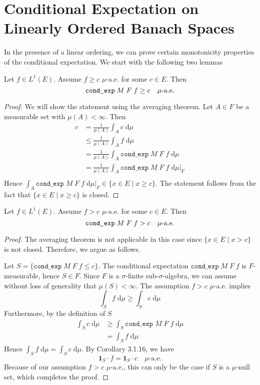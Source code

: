 \section{Conditional Expectation on Linearly Ordered Banach Spaces}

In the presence of a linear ordering, we can prove certain monotonicity properties of the conditional expectation. We start with the following two lemmas

\begin{lemma}
	Let $f \in L^1(E)$. Assume $f \ge c$ $\mu$-a.e. for some $c \in E$. Then 
	\[
		\normalfont\texttt{cond\_exp} \; M \; F \; f \ge c \quad \mu\textrm{-a.e.}
	\]
\end{lemma}
\begin{proof}
	We will show the statement using the averaging theorem. Let $A \in F$ be a measurable set with $\mu(A) < \infty$. Then
	\begin{align*}
		c &= \frac{1}{\mu(A)} \int_A c \; \textrm{d} \mu \\
		&\le \frac{1}{\mu(A)} \int_A f \; \textrm{d} \mu \\
		&= \frac{1}{\mu(A)} \int_A \texttt{cond\_exp} \; M \; F \; f \; \textrm{d} \mu \\
		&= \frac{1}{\mu(A)} \int_A \texttt{cond\_exp} \; M \; F \; f \; \textrm{d} \mu\vert_F \\
	\end{align*}
	Hence $\int_A \texttt{cond\_exp} \; M \; F \; f \; \textrm{d} \mu\vert_F \in \{x \in E \;\vert\; x \ge c \}$. The statement follows from the fact that $\{x \in E \;\vert\; x \ge c \}$ is closed.
\end{proof}

\begin{lemma}
	Let $f \in L^1(E)$. Assume $f > c$ $\mu$-a.e. for some $c \in E$. Then 
	\[
		\normalfont\texttt{cond\_exp} \; M \; F \; f > c \quad \mu\textrm{-a.e.}
	\]
\end{lemma}
\begin{proof}
	The averaging theorem is not applicable in this case since $\{x \in E \;\vert\; x > c \}$ is not closed. Therefore, we argue as follows.
	
	Let $S = \{\texttt{cond\_exp} \; M \; F \; f \le c\}$. The conditional expectation $\texttt{cond\_exp} \; M \; F \; f$ is $F$-measurable, hence $S \in F$. Since $F$ is a $\sigma$-finite sub-$\sigma$-algebra, we can assume without loss of generality that $\mu(S) < \infty$.
	The assumption $f > c$ $\mu$-a.e. implies
	\[
		\int_S f \; \textrm{d} \mu \ge \int_S c \; \textrm{d} \mu
	\]
	Furthermore, by the definition of $S$
	\begin{align*}
		\int_S c \; \textrm{d} \mu &\ge \int_S \texttt{cond\_exp} \; M \; F \; f \; \textrm{d} \mu \\
		&= \int_S f \; \textrm{d} \mu
	\end{align*}
	Hence $\int_S f \; \textrm{d} \mu = \int_S c \; \textrm{d} \mu$. By Corollary 3.1.16, we have
	\[
		\mathbf{1}_S \cdot f = \mathbf{1}_S \cdot c \quad \mu\textrm{-a.e.}
	\]
	Because of our assumption $f > c$ $\mu$-a.e., this can only be the case if $S$ is a $\mu$-null set, which completes the proof.
\end{proof}

